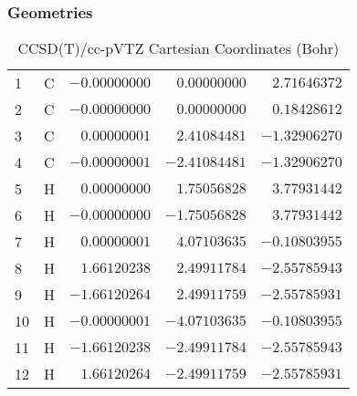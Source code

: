 \documentclass[10pt,oneside]{article}
\begin{document}
\clearpage

\subsection{\ \ \ }

\subsubsection*{Geometries}
\begin{table}[h!]
\centering
\caption{CCSD(T)/cc-pVTZ Cartesian Coordinates (Bohr)}
\begin{tabular}{llrrr}
1  & C  & $-0.00000000$ & $ 0.00000000$ & $ 2.71646372$ \\
2  & C  & $-0.00000000$ & $ 0.00000000$ & $ 0.18428612$ \\
3  & C  & $ 0.00000001$ & $ 2.41084481$ & $-1.32906270$ \\
4  & C  & $-0.00000001$ & $-2.41084481$ & $-1.32906270$ \\
5  & H  & $ 0.00000000$ & $ 1.75056828$ & $ 3.77931442$ \\
6  & H  & $-0.00000000$ & $-1.75056828$ & $ 3.77931442$ \\
7  & H  & $ 0.00000001$ & $ 4.07103635$ & $-0.10803955$ \\
8  & H  & $ 1.66120238$ & $ 2.49911784$ & $-2.55785943$ \\
9  & H  & $-1.66120264$ & $ 2.49911759$ & $-2.55785931$ \\
10 & H  & $-0.00000001$ & $-4.07103635$ & $-0.10803955$ \\
11 & H  & $-1.66120238$ & $-2.49911784$ & $-2.55785943$ \\
12 & H  & $ 1.66120264$ & $-2.49911759$ & $-2.55785931$ \\
\end{tabular}
\end{table}
\end{document}
